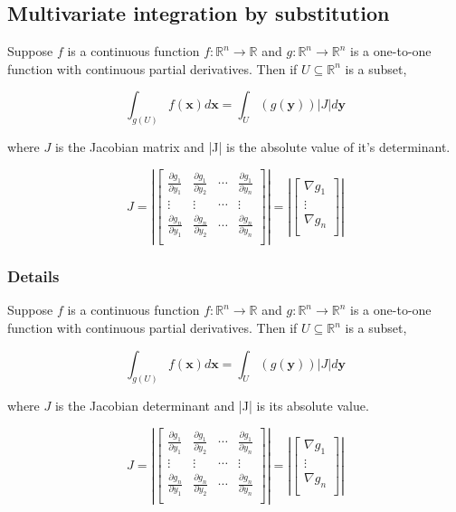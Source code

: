 \documentclass[12pt,a4paper]{article}
\theoremstyle{regla}
\theoremstyle{remark}
\theoremstyle{definition}
\theoremstyle{nonumberbreak}
\begin{document}
\subsection{Multivariate integration by substitution}
\begin{fbox}
\begin{minipage}{0.97\textwidth}
Suppose $f$ is a continuous function 
$f: \mathbb{R}^n \rightarrow \mathbb{R}$ and $g: \mathbb{R}^n \rightarrow \mathbb{R}^n$ is a one-to-one function with continuous partial derivatives. Then if $ U \subseteq \mathbb{R}^n$ is a subset,

$$\int_{g(U)} f(\mathbf {x})d\mathbf {x}  = \int_{U}({g}(\mathbf {y}))|J|d\mathbf {y}$$

where $J$ is the Jacobian matrix and |J| is the absolute value of it's determinant.


$$J=
\left|\begin{bmatrix}
\frac{\partial g_1}{\partial y_1} & \frac{\partial g_1}{\partial y_2} & \cdots &\frac{\partial g_1}{\partial y_n} \\
\vdots & \vdots & \cdots & \vdots \\
\frac{\partial g_n}{\partial y_1} & \frac{\partial g_n}{\partial y_2} & \cdots & \frac{\partial g_n}{\partial y_n}  \\
\end{bmatrix}\right| = 
\left|\begin{bmatrix}
\nabla g_1 \\
 \vdots \\
\nabla g_n  \\
\end{bmatrix}\right|$$


\end{minipage}
\end{fbox}
\subsubsection{Details}
Suppose $f$ is a continuous function 
$f: \mathbb{R}^n \rightarrow \mathbb{R}$ and $g: \mathbb{R}^n \rightarrow \mathbb{R}^n$ is a one-to-one function with continuous partial derivatives. Then if $ U \subseteq \mathbb{R}^n$ is a subset,

$$\int_{g(U)} f(\mathbf {x})d\mathbf {x}  = \int_{U}({g}(\mathbf {y}))|J|d\mathbf {y}$$

where $J$ is the Jacobian determinant and |J| is its absolute value.


$$J= 
\left|\begin{bmatrix}
\frac{\partial g_1}{\partial y_1} & \frac{\partial g_1}{\partial y_2} & \cdots &\frac{\partial g_1}{\partial y_n} \\
\vdots & \vdots & \cdots & \vdots \\
\frac{\partial g_n}{\partial y_1} & \frac{\partial g_n}{\partial y_2} & \cdots & \frac{\partial g_n}{\partial y_n}  \\
\end{bmatrix}\right| = 
\left|\begin{bmatrix}
\nabla g_1 \\
 \vdots \\
\nabla g_n  \\
\end{bmatrix}\right|$$
\end{document}
